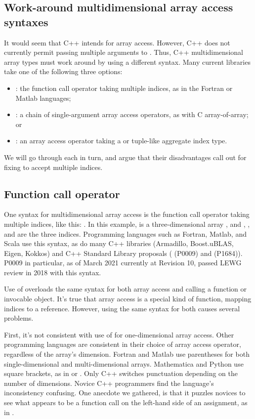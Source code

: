 \documentclass{wg21}
\begin{document}
\subsection{Work-around multidimensional array access syntaxes}

It would seem that C++ intends  for array access.  However, C++ does not currently permit passing multiple arguments to .  Thus, C++ multidimensional array types must work around by using a different syntax.  Many current libraries take one of the following three options:

\begin{itemize}
\item {}: the function call operator taking multiple indices, as in the Fortran or Matlab languages;
\item {}: a chain of single-argument array access operators, as with C array-of-array; or
\item {}: an array access operator taking a  or tuple-like aggregate index type.
\end{itemize}

We will go through each in turn, and argue that their disadvantages call out for fixing  to accept multiple indices.

\subsection{Function call operator}

One syntax for multidimensional array access is the function call operator taking multiple indices, like this: .  In this example,  is a three-dimensional array , and , , and  are the three indices.  Programming languages such as Fortran, Matlab, and Scala use this syntax, as do many C++ libraries (Armadillo, Boost.uBLAS, Eigen, Kokkos) and C++ Standard Library proposals ( (P0009) and  (P1684)).  P0009 in particular, as of March 2021 currently at Revision 10, passed LEWG review in 2018 with this syntax.

Use of  overloads the same syntax for both array access and calling a function or invocable object.  It's true that array access is a special kind of function, mapping indices to a reference.  However, using the same syntax for both causes several problems.

First, it's not consistent with use of  for one-dimensional array access.  Other programming languages are consistent in their choice of array access operator, regardless of the array's dimension.  Fortran and Matlab use parentheses for both single-dimensional and multi-dimensional arrays.  Mathematica and Python use square brackets, as in  or .  Only C++ switches punctuation depending on the number of dimensions.  Novice C++ programmers find the language's inconsistency confusing.  One anecdote we gathered, is that it puzzles novices to see what appears to be a function call on the left-hand side of an assignment, as in .
\end{document}
